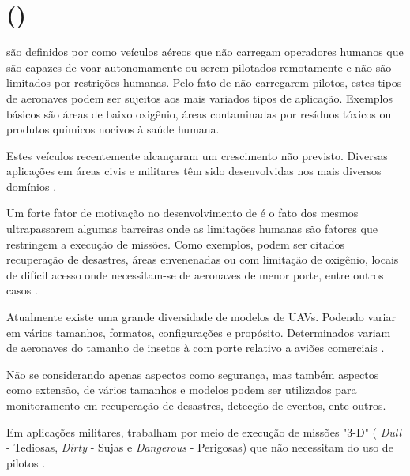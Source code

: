 \section{\uavs (\vants) }

\vants são definidos por \cite{uav_roadmap2005} como veículos aéreos que não carregam operadores humanos que são capazes de voar autonomamente ou serem pilotados remotamente e não são limitados por restrições humanas. Pelo fato de não carregarem pilotos, estes tipos de aeronaves podem ser sujeitos aos mais variados tipos de aplicação.
Exemplos básicos são áreas de baixo oxigênio, áreas contaminadas por resíduos tóxicos ou produtos químicos nocivos à saúde humana.

Estes veículos recentemente alcançaram um crescimento não previsto. Diversas aplicações em áreas civis e militares têm sido desenvolvidas nos mais diversos domínios \cite{Valavanis2007}.


Um forte fator de motivação no desenvolvimento de \vants é o fato dos mesmos ultrapassarem algumas barreiras onde as limitações humanas são fatores que restringem a execução de missões. Como exemplos, podem ser citados recuperação de desastres, áreas envenenadas ou com limitação de oxigênio, locais de difícil acesso onde necessitam-se de aeronaves de menor porte, entre outros casos \cite{uas_2009}. 

Atualmente existe uma grande diversidade de modelos de UAVs. Podendo variar em vários tamanhos, formatos, configurações e propósito.
Determinados \vants variam de aeronaves do tamanho de insetos à \vants com porte relativo a aviões comerciais \cite{Bone2003}.

Não se considerando apenas aspectos como segurança, mas também aspectos como extensão, \vants de vários tamanhos e modelos podem ser utilizados para monitoramento em recuperação de desastres, detecção de eventos, ente outros. 

Em aplicações militares, \vants trabalham por meio de execução de missões "3-D" ( \emph{Dull} - Tediosas, \emph{Dirty} - Sujas e \emph{Dangerous} - Perigosas) que não necessitam do uso de pilotos \cite{Bone2003}.


